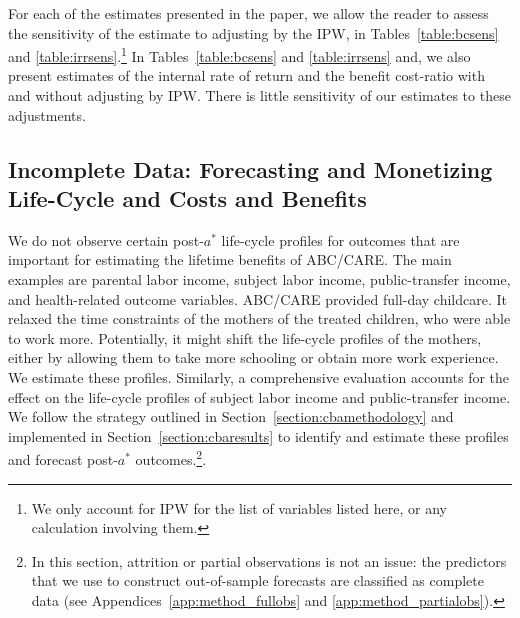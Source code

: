 \noindent For each of the estimates presented in the paper, we allow the reader to assess the sensitivity of the estimate to adjusting by the IPW, in Tables~\ref{table:bcsens} and \ref{table:irrsens}.\footnote{We only account for IPW for the list of variables listed here, or any calculation involving them.} In Tables~\ref{table:bcsens} and \ref{table:irrsens} and, we also present estimates of the internal rate of return and the benefit cost-ratio with and without adjusting by IPW. There is little sensitivity of our estimates to these adjustments.

\subsection{Incomplete Data: Forecasting and Monetizing Life-Cycle and Costs and Benefits} \label{appendix:incomplete}
\label{app:method_noobs}

\noindent We do not observe certain post-$a^*$ life-cycle profiles for outcomes that are important for estimating the lifetime benefits of ABC/CARE. The main examples are parental labor income, subject labor income, public-transfer income, and health-related outcome variables. ABC/CARE provided full-day childcare. It relaxed the time constraints of the mothers of the treated children, who were able to work more. Potentially, it might shift the life-cycle profiles of the mothers, either by allowing them to take more schooling or obtain more work experience. We estimate these profiles. Similarly, a comprehensive evaluation accounts for the effect on the life-cycle profiles of subject labor income and public-transfer income. We follow the strategy outlined in Section~\ref{section:cbamethodology} and implemented in Section~\ref{section:cbaresults} to identify and estimate these profiles and forecast post-$a^\ast$ outcomes.\footnote{In this section, attrition or partial observations is not an issue: the predictors that we use to construct out-of-sample forecasts are classified as complete data (see Appendices~\ref{app:method_fullobs} and \ref{app:method_partialobs}).}.

